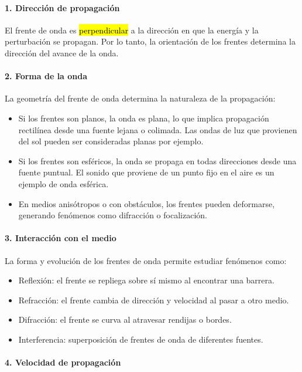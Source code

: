 \paragraph{1. Dirección de propagación}

El frente de onda es \hl{perpendicular} a la dirección en que la energía y la perturbación se propagan. Por lo tanto, la orientación de los frentes determina la dirección del avance de la onda.

\paragraph{2. Forma de la onda}

La geometría del frente de onda determina la naturaleza de la propagación:
\begin{itemize}
  \item Si los frentes son planos, la onda es plana, lo que implica propagación rectilínea desde una fuente lejana o colimada. Las ondas de luz que provienen del sol pueden ser consideradas planas por ejemplo.
  \item Si los frentes son esféricos, la onda se propaga en todas direcciones desde una fuente puntual. El sonido que proviene de un punto fijo en el aire es un ejemplo de onda esférica.
  \item En medios anisótropos o con obstáculos, los frentes pueden deformarse, generando fenómenos como difracción o focalización.
\end{itemize}

\paragraph{3. Interacción con el medio}

La forma y evolución de los frentes de onda permite estudiar fenómenos como:
    \begin{itemize}
      \item Reflexión: el frente se repliega sobre sí mismo al encontrar una barrera.
      \item Refracción: el frente cambia de dirección y velocidad al pasar a otro medio.
      \item Difracción: el frente se curva al atravesar rendijas o bordes.
      \item Interferencia: superposición de frentes de onda de diferentes fuentes.
    \end{itemize}

\paragraph{4. Velocidad de propagación}


